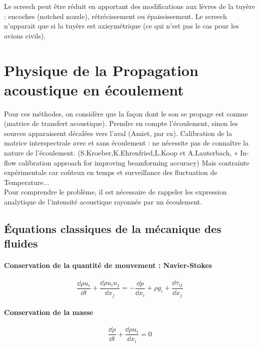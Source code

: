 Le screech peut être réduit en apportant des modifications aux lèvres de la tuyère : encoches (notched nozzle), rétrécissement ou épaississement. Le screech n'apparait que si la tuyère est axisymétrique (ce qui n'est pas le cas pour les avions civils).




\section{Physique de la Propagation acoustique en écoulement}

Pour ces méthodes, on considère que la façon dont le son se propage est connue (matrice de transfert acoustique). Prendre en compte l'écoulement, sinon les sources apparaissent décalées vers l'aval (Amiet, par ex). 
Calibration de la matrice interspectrale avec et sans écoulement : ne nécessite pas de connaître la nature de l'écoulement. (S.Kroeber,K.Ehrenfried,L.Koop et A.Lauterbach, « In-flow calibration approach for improving beamforming accuracy) Mais contrainte expérimentale car coûteux en temps et surveillance des fluctuation de Temperature...\\


Pour comprendre le problème, il est nécessaire de rappeler les expression analytique de l'intensité acoustique rayonnée par un écoulement.

\subsection{Équations classiques de la mécanique des fluides}
\vspace{0.3cm}\paragraph{Conservation de la quantité de mouvement : Navier-Stokes}
\begin{equation}
	\frac{\dd \rho u_i}{\dd t} + \frac{\dd \rho u_i u_j}{\dd x_j} = -\frac{\dd p}{\dd x_i} + \rho g_i + \frac{\dd \tau_{ij}}{\dd x_j}
\end{equation}
\paragraph{Conservation de la masse}
\begin{equation}
 \frac{\dd \rho}{\dd t} + \frac{\dd \rho u_{i}}{\dd x_i} = 0
\end{equation}

